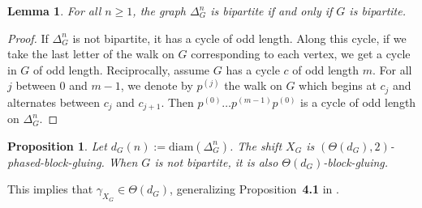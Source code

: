 \documentclass{article}
\newtheorem{lemma}[theorem]{Lemma}
\newtheorem{proposition}[theorem]{Proposition}
\begin{document}
\begin{lemma}
For all $n \ge 1$, the graph $\Delta_G^n$ is bipartite if and only if $G$ is bipartite. 
\end{lemma}

\begin{proof}
If $\Delta_G^n$ is not bipartite, it has a cycle of odd length. Along this cycle, if we take the last letter of the walk on $G$ corresponding to each vertex, we get a cycle in $G$ of odd length. 
Reciprocally, assume $G$ has a cycle $c$ of odd length $m$. For all $j$ between $0$ and $m-1$,
we denote by $p^{(j)}$ the walk on $G$ which begins at $c_j$ and alternates between $c_j$ 
and $c_{j+1}$. Then $p^{(0)} \ldots p^{(m-1)} p^{(0)}$ is a cycle of odd length on $\Delta_G^n$. 
\end{proof}



\begin{proposition}\label{prop:block-gluing}
Let $d_G (n) := \textrm{diam}(\Delta_G^n)$.
The shift $X_G$ is $(\Theta(d_G),2)$-phased-block-gluing. When $G$ is not bipartite, it is 
also $\Theta(d_G)$-block-gluing.
\end{proposition}

This implies that $\gamma_{X_G} \in \Theta(d_G)$, generalizing Proposition~\textbf{4.1} in \cite{CM18}. 
\end{document}
